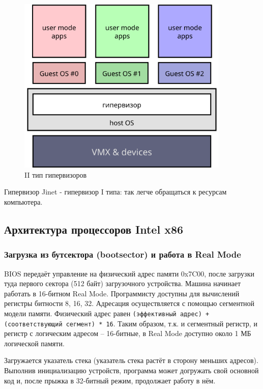 \documentclass[a4paper,11pt]{extarticle}
\begin{document}
\begin{itemize}
\begin{figure}[htb]
\begin{minipage}{0.45\textwidth}
				\includegraphics[width=0.9\textwidth]{../diagrams/hyper_type2.png}
				\caption{II тип гипервизоров}
				\label{fig:hypertype2}
			\end{minipage}
		\end{figure}
		Гипервизор Jinet - гипервизор I типа: так легче обращаться к ресурсам компьютера.
	\end{itemize}
	\subsection{Архитектура процессоров Intel x86}
	\subsubsection{Загрузка из бутсектора (bootsector) и работа в Real Mode}
	BIOS передаёт управление на физический адрес памяти 0x7C00, после загрузки туда первого сектора (512 байт) загрузочного устройства. Машина начинает работать в 16-битном Real Mode. Программисту доступны для вычислений регистры битности 8, 16, 32. Адресация осуществляется с помощью сегментной модели памяти. Физический адрес равен \texttt{(эффективный адрес) + (соответствующий сегмент) * 16}. Таким образом, т.к. и сегментный регистр, и регистр с логическим адресом -- 16-битные, в Real Mode доступно около 1 МБ логической памяти.\par
	Загружается указатель стека (указатель стека растёт в сторону меньших адресов). Выполнив инициализацию устройств, программа может догружать свой основной код и, после прыжка в 32-битный режим, продолжает работу в нём. \par
\end{document}
